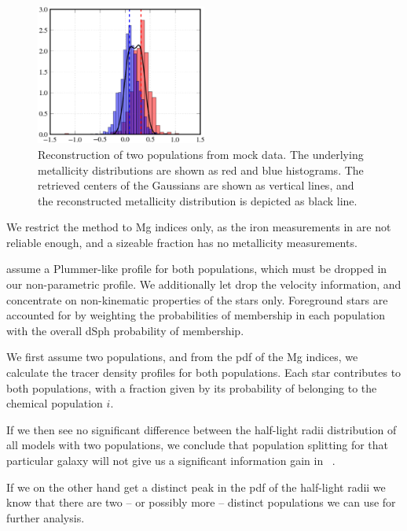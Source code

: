 \begin{figure}
    \begin{center}
        \includegraphics[width=0.5\textwidth]{fig/pymcmetals}
        \caption{Reconstruction of two populations from mock data. The
          underlying metallicity distributions are shown as red and
          blue histograms. The retrieved centers of the Gaussians are
          shown as vertical lines, and the reconstructed metallicity
          distribution is depicted as black line.}
        \label{fig:pymcmetal}
    \end{center}
\end{figure}

We restrict the method to Mg indices only, as the iron measurements in
\cite{WalkerPenarrubia2011} are not reliable enough, and a sizeable
fraction has no metallicity measurements.

\cite{WalkerPenarrubia2011} assume a Plummer-like profile for both
populations, which must be dropped in our non-parametric profile. We
additionally let drop the velocity information, and concentrate on
non-kinematic properties of the stars only. Foreground stars are
accounted for by weighting the probabilities of membership in each
population with the overall dSph probability of membership.

We first assume two populations, and from the pdf of the Mg indices,
we calculate the tracer density profiles for both populations. Each
star contributes to both populations, with a fraction given by its
probability of belonging to the chemical population $i$.

If we then see no significant difference between the half-light radii
distribution of all models with two populations, we conclude that
population splitting for that particular galaxy will not give us a
significant information gain in \GravImage\ .

If we on the other hand get a distinct peak in the pdf of the
half-light radii we know that there are two -- or possibly more --
distinct populations we can use for further analysis.

